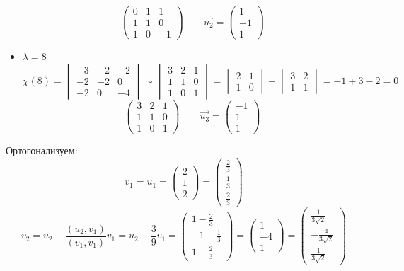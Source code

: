 \begin{itemize}
$$\begin{pmatrix}
    	0 & 1 & 1 \\
        1 & 1 & 0 \\
        1 & 0 & -1
    \end{pmatrix} \qquad \vec{u_2} =
    \begin{pmatrix}
    	1 \\
        -1 \\
        1
    \end{pmatrix} $$
    \item $ \lambda = 8 $
    $$ \chi(8) =
    \begin{vmatrix}
    	-3 & -2 & -2 \\
        -2 & -2 & 0 \\
        -2 & 0 & -4
    \end{vmatrix} \sim
    \begin{vmatrix}
    	3 & 2 & 1 \\
        1 & 1 & 0 \\
        1 & 0 & 1
    \end{vmatrix} =
    \begin{vmatrix}
    	2 & 1 \\
        1 & 0
    \end{vmatrix} +
    \begin{vmatrix}
    	3 & 2 \\
        1 & 1
    \end{vmatrix} = -1 + 3 - 2 = 0 $$
    $$
    \begin{pmatrix}
    	3 & 2 & 1 \\
        1 & 1 & 0 \\
        1 & 0 & 1
    \end{pmatrix} \qquad \vec{u_3} =
    \begin{pmatrix}
    	-1 \\
        1 \\
        1
    \end{pmatrix} $$
\end{itemize}
Ортогонализуем:
$$ v_1 = u_1 =
\begin{pmatrix}
	2 \\
    1 \\
    2
\end{pmatrix} =
\begin{pmatrix}
	\frac23 \\
    \frac13 \\
    \frac23
\end{pmatrix} $$
$$ v_2 = u_2 - \frac{(u_2, v_1)}{(v_1, v_1)}v_1 = u_2 - \frac39v_1 =
\begin{pmatrix}
	1 - \frac23 \\
    -1 - \frac13 \\
    1 - \frac23
\end{pmatrix} =
\begin{pmatrix}
	1 \\
    -4 \\
    1
\end{pmatrix} =
\begin{pmatrix}
    \frac1{3\sqrt2} \\
    -\frac4{3\sqrt2} \\
    \frac1{3\sqrt2}
\end{pmatrix} $$
